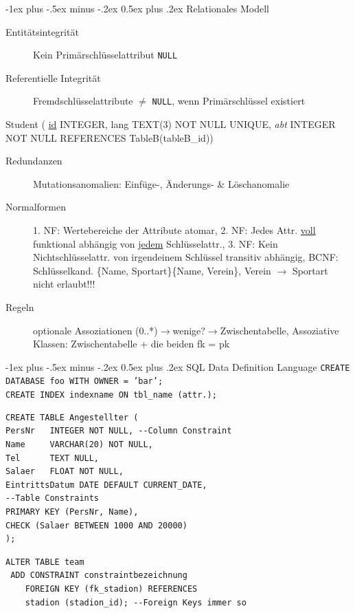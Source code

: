 \documentclass[10pt,landscape,a4paper]{article}
\makeatletter
\renewcommand{\section}{\@startsection{section}{1}{0mm}%
                                {-1ex plus -.5ex minus -.2ex}%
                                {0.5ex plus .2ex}%
                                {\normalfont\large\bfseries}}
\newcommand{\sql}[1]{\texttt{#1}}
\makeatother
\begin{document}
\begin{multicols*}{3}
\section{Relationales Modell}
\begin{description}
\item[Entitätsintegrität]Kein Primärschlüsselattribut \texttt{NULL}
\item[Referentielle Integrität]Fremdschlüsselattribute $\neq$ \texttt{NULL}, wenn Primärschlüssel existiert
\end{description}
  Student (
\underline{id} INTEGER, 
lang TEXT(3) NOT NULL UNIQUE, 
\textit{abt} INTEGER NOT NULL REFERENCES TableB(tableB\_id))  
\begin{description}
\item[Redundanzen] Mutationsanomalien: Einfüge-, Änderungs- & Löschanomalie
\item[Normalformen] 1. NF: Wertebereiche der Attribute atomar, 2. NF: Jedes Attr. \underline{voll} funktional abhängig von \underline{jedem} Schlüsselattr., 3. NF: Kein Nichtschlüsselattr. von irgendeinem Schlüssel transitiv abhängig, BCNF: Schlüsselkand. \{Name, Sportart\}\{Name, Verein\}, Verein $\rightarrow$ Sportart nicht erlaubt!!!
\item[Regeln]optionale Assoziationen (0..*)$\rightarrow$wenige?$\rightarrow$Zwischentabelle, Assoziative Klassen: Zwischentabelle + die beiden fk = pk
\end{description}

\section{SQL Data Definition Language}
\texttt{CREATE DATABASE foo WITH OWNER = 'bar';}\\
\sql{CREATE INDEX indexname ON tbl_name (attr.);}
\begin{verbatim}
CREATE TABLE Angestellter (
PersNr   INTEGER NOT NULL, --Column Constraint
Name     VARCHAR(20) NOT NULL,
Tel      TEXT NULL,
Salaer   FLOAT NOT NULL,
EintrittsDatum DATE DEFAULT CURRENT_DATE,
--Table Constraints 
PRIMARY KEY (PersNr, Name), 
CHECK (Salaer BETWEEN 1000 AND 20000)
);
\end{verbatim}
\begin{verbatim}
ALTER TABLE team 
 ADD CONSTRAINT constraintbezeichnung 
	FOREIGN KEY (fk_stadion) REFERENCES 
	stadion (stadion_id); --Foreign Keys immer so
	


\end{verbatim}
\end{multicols*}
\end{document}
